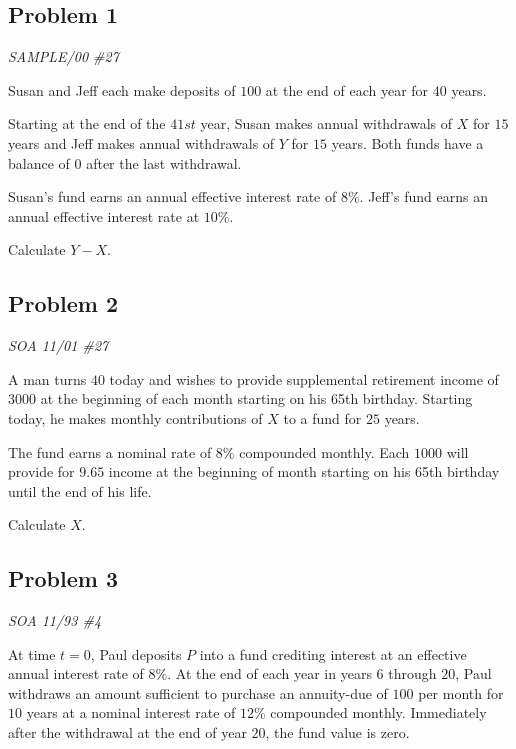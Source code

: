 \documentclass[
]{book}
\begin{document}
\hypertarget{problem-1}{%
\subsection*{Problem 1}\label{problem-1}}

\emph{SAMPLE/00 \#27}

Susan and Jeff each make deposits of \(100\) at the end of each year for \(40\) years.

Starting at the end of the \(41st\) year, Susan makes annual withdrawals of \(X\) for \(15\) years and Jeff makes annual withdrawals of \(Y\) for \(15\) years. Both funds have a balance of \(0\) after the last withdrawal.

Susan's fund earns an annual effective interest rate of \(8\%\). Jeff's fund earns an annual effective interest rate at \(10\%\).

Calculate \(Y-X\).

\hypertarget{problem-2}{%
\subsection*{Problem 2}\label{problem-2}}

\emph{SOA 11/01 \#27}

A man turns \(40\) today and wishes to provide supplemental retirement income of \(3000\) at the beginning of each month starting on his 65th birthday. Starting today, he makes monthly contributions of \(X\) to a fund for \(25\) years.

The fund earns a nominal rate of \(8\%\) compounded monthly. Each \(1000\) will provide for \(9.65\) income at the beginning of month starting on his 65th birthday until the end of his life.

Calculate \(X\).

\hypertarget{problem-3}{%
\subsection*{Problem 3}\label{problem-3}}

\emph{SOA 11/93 \#4}

At time \(t=0\), Paul deposits \(P\) into a fund crediting interest at an effective annual interest rate of \(8\%\). At the end of each year in years \(6\) through \(20\), Paul withdraws an amount sufficient to purchase an annuity-due of \(100\) per month for \(10\) years at a nominal interest rate of \(12\%\) compounded monthly. Immediately after the withdrawal at the end of year \(20\), the fund value is zero.
\end{document}
